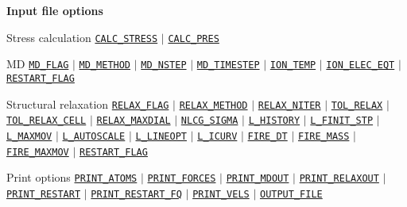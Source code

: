 \documentclass[xcolor=dvipsnames,t]{beamer}
\begin{document}
\begin{frame}[allowframebreaks]{\textbf{Input file options}}
\vspace{-2mm}
\begin{block}{Stress calculation}
\hyperlink{CALC_STRESS}{\texttt{CALC\_STRESS}} $\vert$ \hyperlink{CALC_PRES}{\texttt{CALC\_PRES}}
\end{block}
\vspace{-2mm}

\begin{block}{MD}
\hyperlink{MD_FLAG}{\texttt{MD\_FLAG}} $\vert$ \hyperlink{MD_METHOD}{\texttt{MD\_METHOD}} $\vert$ \hyperlink{MD_NSTEP}{\texttt{MD\_NSTEP}} $\vert$ \hyperlink{MD_TIMESTEP}{\texttt{MD\_TIMESTEP}} $\vert$ \hyperlink{ION_TEMP}{\texttt{ION\_TEMP}} $\vert$ \hyperlink{ION_ELEC_EQT}{\texttt{ION\_ELEC\_EQT}} $\vert$ \hyperlink{RESTART_FLAG}{\texttt{RESTART\_FLAG}}
\end{block}
\vspace{-2mm}
\begin{block}{Structural relaxation}
\hyperlink{RELAX_FLAG}{\texttt{RELAX\_FLAG}} $\vert$ \hyperlink{RELAX_METHOD}{\texttt{RELAX\_METHOD}} $\vert$ \hyperlink{RELAX_NITER}{\texttt{RELAX\_NITER}} $\vert$ \hyperlink{TOL_RELAX}{\texttt{TOL\_RELAX}} $\vert$ \hyperlink{TOL_RELAX_CELL}{\texttt{TOL\_RELAX\_CELL}} $\vert$ \hyperlink{RELAX_MAXDIAL}{\texttt{RELAX\_MAXDIAL}} $\vert$ \hyperlink{NLCG_SIGMA}{\texttt{NLCG\_SIGMA}} $\vert$ \hyperlink{L_HISTORY}{\texttt{L\_HISTORY}} $\vert$ \hyperlink{L_FINIT_STP}{\texttt{L\_FINIT\_STP}} $\vert$ \hyperlink{L_MAXMOV}{\texttt{L\_MAXMOV}} $\vert$ \hyperlink{L_AUTOSCALE}{\texttt{L\_AUTOSCALE}} $\vert$ \hyperlink{L_LINEOPT}{\texttt{L\_LINEOPT}} $\vert$ \hyperlink{L_ICURV}{\texttt{L\_ICURV}} $\vert$ \hyperlink{FIRE_DT}{\texttt{FIRE\_DT}} $\vert$ \hyperlink{FIRE_MASS}{\texttt{FIRE\_MASS}} $\vert$ \hyperlink{FIRE_MAXMOV}{\texttt{FIRE\_MAXMOV}} $\vert$ \hyperlink{RESTART_FLAG}{\texttt{RESTART\_FLAG}}
\end{block}

\begin{block}{Print options}
\hyperlink{PRINT_ATOMS}{\texttt{PRINT\_ATOMS}} $\vert$ \hyperlink{PRINT_FORCES}{\texttt{PRINT\_FORCES}} $\vert$ \hyperlink{PRINT_MDOUT}{\texttt{PRINT\_MDOUT}} $\vert$ \hyperlink{PRINT_RELAXOUT}{\texttt{PRINT\_RELAXOUT}} $\vert$ \hyperlink{PRINT_RESTART}{\texttt{PRINT\_RESTART}} $\vert$ \hyperlink{PRINT_RESTART_FQ}{\texttt{PRINT\_RESTART\_FQ}} $\vert$ \hyperlink{PRINT_VELS}{\texttt{PRINT\_VELS}} $\vert$ \hyperlink{OUTPUT_FILE}{\texttt{OUTPUT\_FILE}}
\end{block}


\end{frame}
\end{document}

